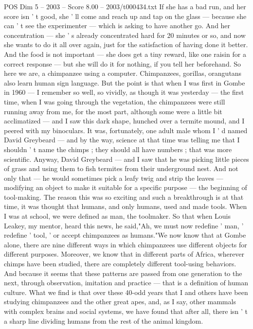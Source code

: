 \begin{textsample}{POS Dim 5 – 2003 – Score 8.00 – 2003/t000434.txt}
If she has a bad run, and her score isn ' t good, she ' ll come and reach up and tap on the glass — because she can ' t see the experimenter — which is asking to have another go.
And her concentration — she ' s already concentrated hard for 20 minutes or so, and now she wants to do it all over again, just for the satisfaction of having done it better.
And the food is not important — she does get a tiny reward, like one raisin for a correct response — but she will do it for nothing, if you tell her beforehand.
So here we are, a chimpanzee using a computer.
Chimpanzees, gorillas, orangutans also learn human sign language.
But the point is that when I was first in Gombe in 1960 — I remember so well, so vividly, as though it was yesterday — the first time, when I was going through the vegetation, the chimpanzees were still running away from me, for the most part, although some were a little bit acclimatized — and I saw this dark shape, hunched over a termite mound, and I peered with my binoculars.
It was, fortunately, one adult male whom I ' d named David Greybeard — and by the way, science at that time was telling me that I shouldn ' t name the chimps ; they should all have numbers ; that was more scientific.
Anyway, David Greybeard — and I saw that he was picking little pieces of grass and using them to fish termites from their underground nest.
And not only that — he would sometimes pick a leafy twig and strip the leaves — modifying an object to make it suitable for a specific purpose — the beginning of tool-making.
The reason this was so exciting and such a breakthrough is at that time, it was thought that humans, and only humans, used and made tools.
When I was at school, we were defined as man, the toolmaker.
So that when Louis Leakey, my mentor, heard this news, he said,"Ah, we must now redefine ' man, ' redefine ' tool, ' or accept chimpanzees as humans."We now know that at Gombe alone, there are nine different ways in which chimpanzees use different objects for different purposes.
Moreover, we know that in different parts of Africa, wherever chimps have been studied, there are completely different tool-using behaviors.
And because it seems that these patterns are passed from one generation to the next, through observation, imitation and practice — that is a definition of human culture.
What we find is that over these 40-odd years that I and others have been studying chimpanzees and the other great apes, and, as I say, other mammals with complex brains and social systems, we have found that after all, there isn ' t a sharp line dividing humans from the rest of the animal kingdom.

\end{textsample}
